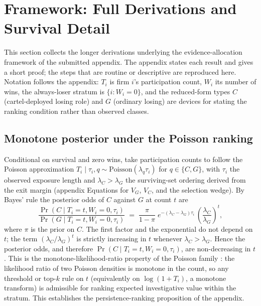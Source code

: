 \section{Framework: Full Derivations and Survival Detail}
\label{supp:theory}

This section collects the longer derivations underlying the
evidence-allocation framework of the submitted appendix. The appendix
states each result and gives a short proof; the steps that are routine
or descriptive are reproduced here. Notation follows the appendix:
$T_i$ is firm $i$'s participation count, $W_i$ its number of wins, the
always-loser stratum is $\{i:W_i=0\}$, and the reduced-form types $C$
(cartel-deployed losing role) and $G$ (ordinary losing) are devices for
stating the ranking condition rather than observed classes.

\subsection{Monotone posterior under the Poisson ranking}
\label{supp:theory_monotone}

Conditional on survival and zero wins, take participation counts to
follow the Poisson approximation
$T_i\mid\tau_i,q\sim\text{Poisson}(\lambda_q\tau_i)$ for $q\in\{C,G\}$,
with $\tau_i$ the observed exposure length and $\lambda_C>\lambda_G$ the
surviving-set ordering derived from the exit margin (appendix
Equations for $V_G$, $V_C$, and the selection wedge). By Bayes' rule
the posterior odds of $C$ against $G$ at count $t$ are
\begin{equation}
\label{supp:eq_posterior_odds}
  \frac{\Pr(C\mid T_i=t,W_i=0,\tau_i)}{\Pr(G\mid T_i=t,W_i=0,\tau_i)}
  \;=\;
  \frac{\pi}{1-\pi}\;
  e^{-(\lambda_C-\lambda_G)\tau_i}\,
  \left(\frac{\lambda_C}{\lambda_G}\right)^{t},
\end{equation}
where $\pi$ is the prior on $C$. The first factor and the exponential do
not depend on $t$; the term $(\lambda_C/\lambda_G)^{t}$ is strictly
increasing in $t$ whenever $\lambda_C>\lambda_G$. Hence the posterior
odds, and therefore $\Pr(C\mid T_i=t,W_i=0,\tau_i)$, are non-decreasing
in $t$. This is the monotone-likelihood-ratio property of the Poisson
family \citep{karlin1956theory}: the likelihood ratio of two Poisson
densities is monotone in the count, so any threshold or top-$k$ rule on
$t$ (equivalently on $\log(1+T_i)$, a monotone transform) is admissible
for ranking expected investigative value within the stratum. This
establishes the persistence-ranking proposition of the appendix.

